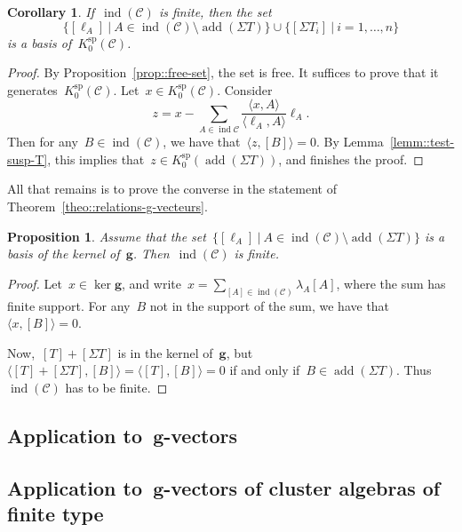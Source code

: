 \documentclass{amsart}
\newtheorem{corollary}[theorem]{Corollary}
\newtheorem{proposition}[theorem]{Proposition}
\theoremstyle{definition}
\renewcommand{\b}[1]{{\boldsymbol{#1}}} %
\newcommand{\cat}{\mathcal{C}}
\newcommand{\susp}{\Sigma}
\newcommand{\add}{\operatorname{add}}
\newcommand{\spl}{\operatorname{sp}}
\newcommand{\Ksp}{K_0^{\spl}}
\newcommand{\ind}{\operatorname{ind}}
\begin{document}
\begin{corollary}
 If~$\ind(\cat)$ is finite, then the set~\[\{[\ell_A] \ | \ A\in \ind(\cat) \setminus \add(\susp T) \} \cup \{[\susp T_i] \ | \ i=1, \ldots, n\}\] is a basis of~$\Ksp(\cat)$.
\end{corollary}
\begin{proof}
 By Proposition~\ref{prop::free-set}, the set is free.  It suffices to prove that it generates~$\Ksp(\cat)$.  Let~$x\in \Ksp(\cat)$.  Consider
 \[
  z = x - \sum_{A\in \ind{\cat}} \frac{\langle x, A \rangle}{\langle \ell_A, A\rangle} \ell_A.
 \]
 Then for any~$B\in \ind(\cat)$, we have that~$\langle z, [B] \rangle = 0$.  By Lemma~\ref{lemm::test-susp-T}, this implies that~$z\in \Ksp(\add(\susp T))$, and finishes the proof.
\end{proof}


All that remains is to prove the converse in the statement of Theorem~\ref{theo::relations-g-vecteurs}.

\begin{proposition}
 Assume that the set~$\{[\ell_A] \ | \ A\in \ind(\cat) \setminus \add(\susp T) \}$ is a basis of the kernel of~$\b g$. Then~$\ind(\cat)$ is finite.
\end{proposition}
\begin{proof}
 Let~$x\in \ker \b g$, and write~$x = \sum_{[A]\in \ind(\cat)} \lambda_A[A]$, where the sum has finite support.  For any~$B$ not in the support of the sum, we have that~$\langle x, [B] \rangle = 0$.
 
 Now,~$[T]+[\susp T]$ is in the kernel of~$\b g$, but~$\langle [T] + [\susp T], [B] \rangle = \langle [T], [B] \rangle = 0$ if and only if~$B\in \add(\susp T)$.  Thus~$\ind(\cat)$ has to be finite.
\end{proof}


\subsection{Application to~$\b g$-vectors}\label{sect::applications-g-vectors}

\subsection{Application to~$\b g$-vectors of cluster algebras of finite type}\label{sect::applications-g-vectors}
\end{document}
